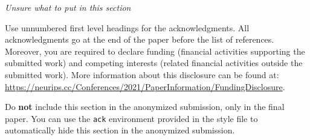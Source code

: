 \begin{ack}
	
	\textit{Unsure what to put in this section}
	
	Use unnumbered first level headings for the acknowledgments. All acknowledgments
	go at the end of the paper before the list of references. Moreover, you are required to declare
	funding (financial activities supporting the submitted work) and competing interests (related financial activities outside the submitted work).
	More information about this disclosure can be found at: \url{https://neurips.cc/Conferences/2021/PaperInformation/FundingDisclosure}.
	
	Do {\bf not} include this section in the anonymized submission, only in the final paper. You can use the \texttt{ack} environment provided in the style file to automatically hide this section in the anonymized submission.
\end{ack}